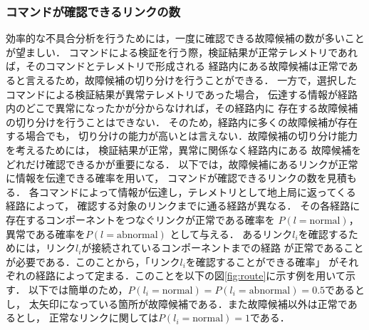 \documentclass[11pt]{jsreport}
\begin{document}
\subsubsection{コマンドが確認できるリンクの数}
効率的な不具合分析を行うためには，一度に確認できる故障候補の数が多いことが望ましい．
コマンドによる検証を行う際，検証結果が正常テレメトリであれば，そのコマンドとテレメトリで形成される
経路内にある故障候補は正常であると言えるため，故障候補の切り分けを行うことができる．
一方で，選択したコマンドによる検証結果が異常テレメトリであった場合，
伝達する情報が経路内のどこで異常になったかが分からなければ，その経路内に
存在する故障候補の切り分けを行うことはできない．
そのため，経路内に多くの故障候補が存在する場合でも，
切り分けの能力が高いとは言えない．故障候補の切り分け能力を考えるためには，
検証結果が正常，異常に関係なく経路内にある
故障候補をどれだけ確認できるかが重要になる．
以下では，故障候補にあるリンクが正常に情報を伝達できる確率を用いて，
コマンドが確認できるリンクの数を見積もる．
各コマンドによって情報が伝達し，テレメトリとして地上局に返ってくる経路によって，
確認する対象のリンクまでに通る経路が異なる．
その各経路に存在するコンポーネントをつなぐリンクが正常である確率を
$P(l = \text{normal})$，異常である確率を$P(l = \text{abnormal})$ %
として与える．
あるリンク$l_i$を確認するためには，リンク$l_i$が接続されているコンポーネントまでの経路
が正常であることが必要である．このことから，「リンク$l_i$を確認することができる確率」
がそれぞれの経路によって定まる．このことを以下の図\ref{fig:route}に示す例を用いて示す．
以下では簡単のため，$P(l_i = \text{normal}) = P(l_i = \text{abnormal}) = 0.5$であるとし，
太矢印になっている箇所が故障候補である．また故障候補以外は正常であるとし，
正常なリンクに関しては$P(l_i = \text{normal}) =1$である．\\
\end{document}
